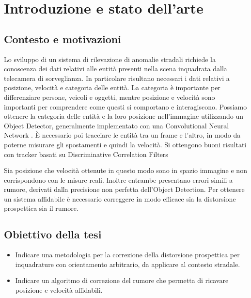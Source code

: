 \chapter{Introduzione e stato dell'arte}
\label{sec:introduzione}


\section{Contesto e motivazioni}

Lo sviluppo di un sistema di rilevazione di anomalie stradali richiede la conoscenza dei dati relativi alle entità presenti nella scena inquadrata dalla telecamera di sorveglianza.
In particolare risultano necessari i dati relativi a posizione, velocità e categoria delle entità.
La categoria è importante per differenziare persone, veicoli e oggetti, mentre posizione e velocità sono importanti per comprendere come questi si comportano e interagiscono.
Possiamo ottenere la categoria delle entità e la loro posizione nell'immagine utilizzando un Object Detector, generalmente implementato con una Convolutional Neural Network \cite{cnn}.
È necessario poi tracciare le entità tra un frame e l'altro, in modo da poterne misurare gli spostamenti e quindi la velocità.
Si ottengono buoni risultati con tracker basati su Discriminative Correlation Filters \cite{dcf}

Sia posizione che velocità ottenute in questo modo sono in spazio immagine e non corrispondono con le misure reali.
Inoltre entrambe presentano errori simili a rumore, derivati dalla precisione non perfetta dell'Object Detection.
Per ottenere un sistema affidabile è necessario correggere in modo efficace sia la distorsione prospettica sia il rumore.

\section{Obiettivo della tesi}
\begin{itemize}
	\item Indicare una metodologia per la correzione della distorsione prospettica per inquadrature con orientamento arbitrario, da applicare al contesto stradale.
	\item Indicare un algoritmo di correzione del rumore che permetta di ricavare posizione e velocità affidabili.
\end{itemize}

